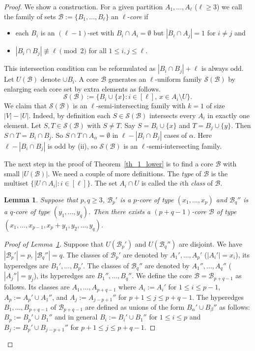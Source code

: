 \documentclass[12pt,a4paper]{amsart}
\numberwithin{equation}{section}
\theoremstyle{plain}
\newtheorem{Lemma}[Th]{Lemma}
\theoremstyle{definition}
\def\cB{{\mathcal{B}}}
\def\cS{{\mathcal{S}}}
\begin{document}
\begin{proof}
We show a construction.
For a given partition $A_1, \dots, A_\ell$ ($\ell\geq 3$) we call the family of sets $\cB:=\{B_1, \dots, B_\ell\}$ an $\ell$-{\em core} if
\begin{itemize}
    \item[(i)] each $B_i$ is an $(\ell-1)$-set with $B_i\cap A_i=\emptyset$ but $|B_i\cap A_j|=1$ for $i\neq j$ and
    \item[(ii)] $|B_i\cap B_j|\not \equiv \ell \pmod 2$ for all $1\leq i,j\leq \ell$.
\end{itemize}
This intersection condition can be reformulated as $|B_i\cap B_j|+\ell$ is always odd.
Let $U(\cB)$ denote $\cup B_i$.
A core $\cB$ generates an $\ell$-uniform family $\cS(\cB)$ by enlarging each core set by extra elements as follows.
$$
   \cS(\cB):= \{ B_i\cup \{ x\}: i\in [\ell], \, x\in A_i\setminus U\}.
  $$
We claim that $\cS(\cB)$ is an $\ell$-semi-intersecting family with $k=1$ of size $|V|-|U|$.
Indeed, by definition each $S \in \cS(\cB)$ intersects every $A_i$ in exactly one element.
Let $S, T \in \cS(\cB)$ with $S \neq T$.
Say $S=B_i\cup \{ x\}$ and $T=B_j\cup \{y\}$.
Then $S\cap T= B_i\cap B_j$.
So $S\cap T\cap A_\alpha=\emptyset$ in $\ell-|B_i\cap B_j|$ cases of $\alpha$.
Here $\ell-|B_i\cap B_j|$ is odd by (ii), so $\cS(\cB)$ is an $\ell$-semi-intersecting family.

The next step in the proof of Theorem~\ref{th_1_lower} is to find a core $\cB$ with small $|U(\cB)|$.
We need a couple of more definitions.
The {\em type} of $\cB$ is the multiset $\{ |U\cap A_i|: i\in [\ell] \}$.
The set $A_i\cap U$ is called the $i$th {\em class} of $\cB$.



\begin{Lemma}\label{le:fusion}
Suppose that $p,q\geq 3$, $\cB_p'$
 is a $p$-core of type $(x_1, \dots, x_p)$ and $\cB_q''$
 is a $q$-core of type $(y_1, \dots, y_q)$. Then there exists a $(p+q-1)$-core $\cB$
 of type $(x_1, \dots, x_{p-1}, x_p+y_1, y_2, \dots, y_q)$.
\end{Lemma}


\begin{proof}[Proof of Lemma~\ref{le:fusion}]
Suppose that $U(\cB_p')$ and  $U(\cB_q'')$ are disjoint.
We have  $|\cB_p'|=p$, $|\cB_q''|=q$.
The classes of $\cB_p'$ are denoted by
 $A_1', \dots, A_p'$ ($|A_i'|=x_i$), its hyperedges are $B_1', \dots, B_p'$.
The classes of $\cB_q''$ are denoted by
 $A_1'', \dots, A_q''$ ($|A_j''|=y_j$), its hyperedges are $B_1'', \dots, B_q''$.
We define the core $\cB=\cB_{p+q-1}$ as follows.
Its classes are $A_1, \dots, A_{p+q-1}$ where $A_i:= A_i'$ for $1\leq i\leq p-1$, $A_p:=A_p'\cup A_1''$, and
 $A_j:= A_{j-p+1}''$ for $p+1\leq j \leq p+q-1$.
The hyperedges $B_1, \dots, B_{p+q-1}$ of $\cB_{p+q-1}$ are defined as unions of the form $B_\alpha'\cup B_\beta''$ as follows:
$B_p:= B_p'\cup B_1''$ and in general $B_i:= B_i'\cup B_1''$ for $1 \leq i\leq p$ and $B_j:= B_p'\cup B_{j-p+1}''$ for $p+1\leq j\leq p+q-1$.



\end{proof}
\end{proof}
\end{document}
